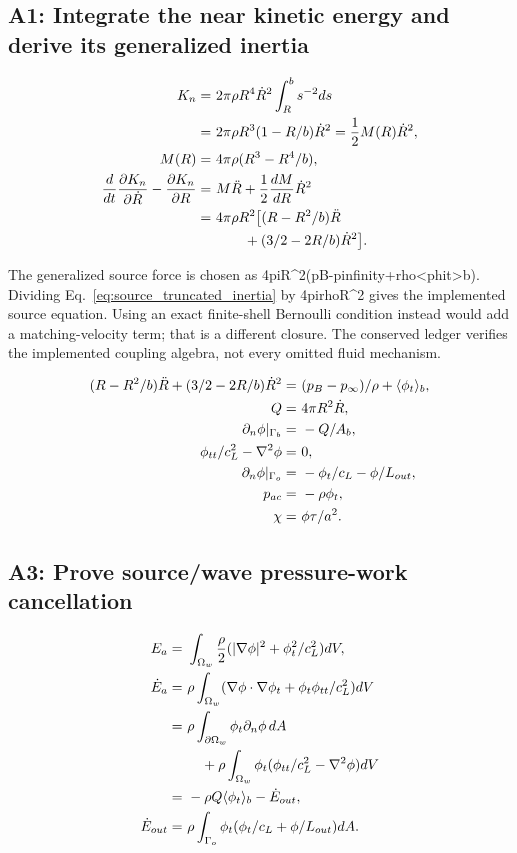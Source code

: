 \documentclass[11pt]{article}
\begin{document}
\subsection{A1: Integrate the near kinetic energy and derive its generalized inertia}

\begin{align}
K_n= & ~2\pi\rho R^4\dot R^2\int_R^b s^{-2}ds \notag \\
= & ~2\pi\rho R^3(1-R/b)\dot R^2=\frac12M(R)\dot R^2, \notag \\
M(R)= & ~4\pi\rho(R^3-R^4/b), \notag \\
\frac{d}{dt}\frac{\partial K_n}{\partial\dot R}-\frac{\partial K_n}{\partial R}= & ~M\ddot R+\frac12\frac{dM}{dR}\dot R^2 \notag \\
= & ~4\pi\rho R^2\big[(R-R^2/b)\ddot R \notag \\
& ~\qquad +(3/2-2R/b)\dot R^2\big]. \label{eq:source_truncated_inertia}
\end{align}

The generalized source force is chosen as 4piR\textasciicircum{}2(pB-pinfinity+rho<phit>b). Dividing Eq.~\eqref{eq:source_truncated_inertia} by 4pirhoR\textasciicircum{}2 gives the implemented source equation. Using an exact finite-shell Bernoulli condition instead would add a matching-velocity term; that is a different closure. The conserved ledger verifies the implemented coupling algebra, not every omitted fluid mechanism.

\begin{align}
(R-R^2/b)\ddot R+(3/2-2R/b)\dot R^2= & ~(p_B-p_\infty)/\rho+\langle\phi_t\rangle_b, \notag \\
Q= & ~4\pi R^2\dot R, \notag \\
\partial_n\phi|_{\Gamma_b}= & ~-Q/A_b, \notag \\
\phi_{tt}/c_L^2-\nabla^2\phi= & ~0, \notag \\
\partial_n\phi|_{\Gamma_o}= & ~-\phi_t/c_L-\phi/L_{out}, \notag \\
p_{ac}= & ~-\rho\phi_t, \notag \\
\chi= & ~\phi\tau/a^2. \label{eq:source_wave_closure}
\end{align}

\subsection{A3: Prove source/wave pressure-work cancellation}

\begin{align}
E_a= & ~\int_{\Omega_w}\frac\rho2(|\nabla\phi|^2+\phi_t^2/c_L^2)dV, \notag \\
\dot E_a= & ~\rho\int_{\Omega_w}(\nabla\phi\cdot\nabla\phi_t+\phi_t\phi_{tt}/c_L^2)dV \notag \\
= & ~\rho\int_{\partial\Omega_w}\phi_t\partial_n\phi\,dA \notag \\
& ~\quad+\rho\int_{\Omega_w}\phi_t(\phi_{tt}/c_L^2-\nabla^2\phi)dV \notag \\
= & ~-\rho Q\langle\phi_t\rangle_b-\dot E_{out}, \notag \\
\dot E_{out}= & ~\rho\int_{\Gamma_o}\phi_t(\phi_t/c_L+\phi/L_{out})dA. \label{eq:wave_energy_flux}
\end{align}
\end{document}
